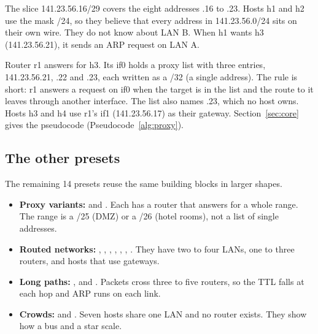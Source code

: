 The slice 141.23.56.16/29 covers the eight addresses .16 to .23. Hosts h1 and h2 use the mask /24, so they believe that every address in 141.23.56.0/24 sits on their own wire. They do not know about LAN B. When h1 wants h3 (141.23.56.21), it sends an ARP request on LAN A.

Router r1 answers for h3. Its if0 holds a proxy list with three entries, 141.23.56.21, .22 and .23, each written as a /32 (a single address). The rule is short: r1 answers a request on if0 when the target is in the list and the route to it leaves through another interface. The list also names .23, which no host owns. Hosts h3 and h4 use r1's if1 (141.23.56.17) as their gateway. Section~\ref{sec:core} gives the pseudocode (Pseudocode~\ref{alg:proxy}).

\subsection{The other presets}
The remaining 14 presets reuse the same building blocks in larger shapes.

\begin{itemize}[leftmargin=1.5em, itemsep=1pt]
\item \textbf{Proxy variants:}  and . Each has a router that answers for a whole range. The range is a /25 (DMZ) or a /26 (hotel rooms), not a list of single addresses.
\item \textbf{Routed networks:} , , , , , , . They have two to four LANs, one to three routers, and hosts that use gateways.
\item \textbf{Long paths:} ,  and . Packets cross three to five routers, so the TTL falls at each hop and ARP runs on each link.
\item \textbf{Crowds:}  and . Seven hosts share one LAN and no router exists. They show how a bus and a star scale.
\end{itemize}
